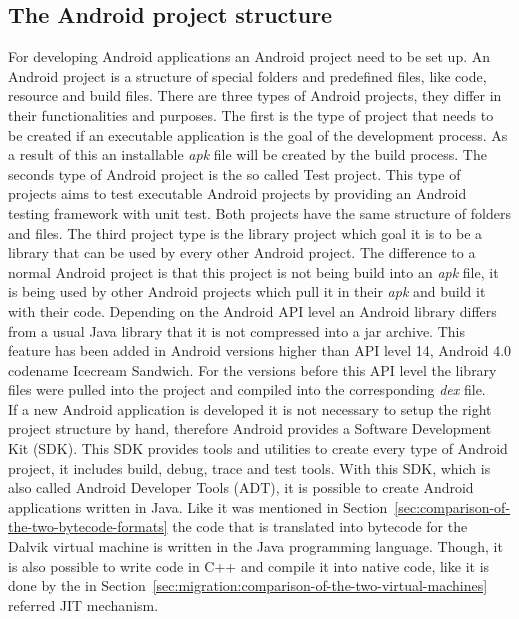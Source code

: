 \subsection{The Android project structure}
\label{sec:migration:the-android-project-structure}
For developing Android applications an Android project need to be set up.
An Android project is a structure of special folders and predefined files, like code, resource and build files.
There are three types of Android projects, they differ in their functionalities and purposes.
The first is the type of project that needs to be created if an executable application is the goal of the development process.
As a result of this an installable \textit{apk} file will be created by the build process.
The seconds type of Android project is the so called Test project.
This type of projects aims to test executable Android projects by providing an Android testing framework with unit test.
Both projects have the same structure of folders and files.
The third project type is the library project which goal it is to be a library that can be used by every other Android project.
The difference to a normal Android project is that this project is not being build into an \textit{apk} file, it is being used by other Android projects which pull it in their \textit{apk} and build it with their code.
Depending on the Android API level an Android library differs from a usual Java library that it is not compressed into a jar archive.
This feature has been added in Android versions higher than API level 14, Android 4.0 codename Icecream Sandwich.
For the versions before this API level the library files were pulled into the project and compiled into the corresponding \textit{dex} file.\\
If a new Android application is developed it is not necessary to setup the right project structure by hand, therefore Android provides a Software Development Kit (SDK).
This SDK provides tools and utilities to create every type of Android project, it includes build, debug, trace and test tools.
With this SDK, which is also called Android Developer Tools (ADT), it is possible to create Android applications written in Java.
Like it was mentioned in Section~\ref{sec:comparison-of-the-two-bytecode-formats} the code that is translated into bytecode for the Dalvik virtual machine is written in the Java programming language.
Though, it is also possible to write code in C++ and compile it into native code, like it is done by the in Section~\ref{sec:migration:comparison-of-the-two-virtual-machines} referred JIT mechanism.
